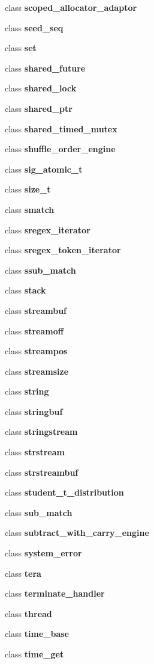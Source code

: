 \begin{DoxyCompactItemize}
class \textbf{ scoped\+\_\+allocator\+\_\+adaptor}
\item 
class \textbf{ seed\+\_\+seq}
\item 
class \textbf{ set}
\item 
class \textbf{ shared\+\_\+future}
\item 
class \textbf{ shared\+\_\+lock}
\item 
class \textbf{ shared\+\_\+ptr}
\item 
class \textbf{ shared\+\_\+timed\+\_\+mutex}
\item 
class \textbf{ shuffle\+\_\+order\+\_\+engine}
\item 
class \textbf{ sig\+\_\+atomic\+\_\+t}
\item 
class \textbf{ size\+\_\+t}
\item 
class \textbf{ smatch}
\item 
class \textbf{ sregex\+\_\+iterator}
\item 
class \textbf{ sregex\+\_\+token\+\_\+iterator}
\item 
class \textbf{ ssub\+\_\+match}
\item 
class \textbf{ stack}
\item 
class \textbf{ streambuf}
\item 
class \textbf{ streamoff}
\item 
class \textbf{ streampos}
\item 
class \textbf{ streamsize}
\item 
class \textbf{ string}
\item 
class \textbf{ stringbuf}
\item 
class \textbf{ stringstream}
\item 
class \textbf{ strstream}
\item 
class \textbf{ strstreambuf}
\item 
class \textbf{ student\+\_\+t\+\_\+distribution}
\item 
class \textbf{ sub\+\_\+match}
\item 
class \textbf{ subtract\+\_\+with\+\_\+carry\+\_\+engine}
\item 
class \textbf{ system\+\_\+error}
\item 
class \textbf{ tera}
\item 
class \textbf{ terminate\+\_\+handler}
\item 
class \textbf{ thread}
\item 
class \textbf{ time\+\_\+base}
\item 
class \textbf{ time\+\_\+get}
\item 

\end{DoxyCompactItemize}

